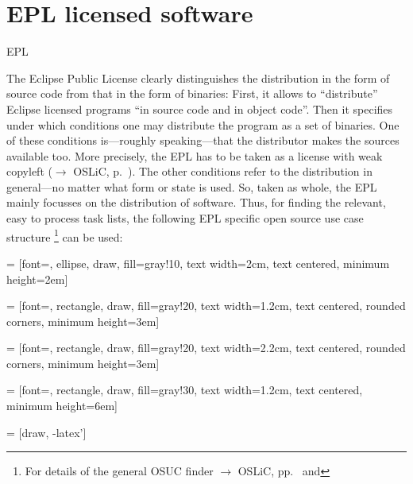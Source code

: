 \section{EPL licensed software}
\begin{license}{EPL}

The Eclipse Public License clearly distinguishes the distribution in the form of
source code from that in the form of binaries: First, it allows to
\enquote{distribute} Eclipse licensed programs \enquote{in source code and in
object code}. Then it specifies under which conditions one may
distribute the program as a set of binaries. One of
these conditions is---roughly speaking---that the distributor makes the sources
available too. More precisely, the EPL has to be taken as a
license with weak copyleft ($\rightarrow$ OSLiC, p.\ ).
The other conditions refer to the distribution in general---no matter what form
or state is used. So, taken as whole, the EPL mainly
focusses on the distribution of software.  Thus, for finding the relevant, easy
to process task lists, the following EPL specific open source use case 
structure%
  \footnote{For details of the general OSUC finder $\rightarrow$ OSLiC,
    pp.\ \pageref{OsucTokens} and \pageref{OsucDefinitionTree}}
can be used:
 
 = [font=\small, ellipse, draw, fill=gray!10, 
    text width=2cm, text centered, minimum height=2em]

 = [font=\footnotesize, rectangle, draw, fill=gray!20, 
    text width=1.2cm, text centered, rounded corners, minimum height=3em]

 = [font=\footnotesize, rectangle, draw, fill=gray!20, 
    text width=2.2cm, text centered, rounded corners, minimum height=3em]
    
 = [font=\tiny, rectangle, draw, fill=gray!30, 
    text width=1.2cm, text centered, minimum height=6em]

 = [draw, -latex']

\end{license}

